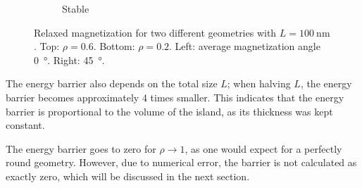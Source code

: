\documentclass[12pt,a4paper]{article}
\begin{document}
\begin{figure}
\begin{subfigure}[b]{0.2\textwidth}
         \caption*{Stable}
         \label{fig:barrier-magnetization-20x100_diag}
     \end{subfigure}
        \caption{Relaxed magnetization for two different geometries with $L=\SI{100}{\nano\metre}$. Top: $\rho=0.6$. Bottom: $\rho=0.2$. Left: average magnetization angle \SI{0}{\degree}. Right: \SI{45}{\degree}.}
        \label{fig:barrier-magnetization}
\end{figure}
The energy barrier also depends on the total size $L$; when halving $L$, the energy barrier becomes approximately 4 times smaller. This indicates that the energy barrier is proportional to the volume of the island, as its thickness was kept constant.

The energy barrier goes to zero for $\rho \rightarrow 1$, as one would expect for a perfectly round geometry. However, due to numerical error, the barrier is not calculated as exactly zero, which will be discussed in the next section.
\end{document}

